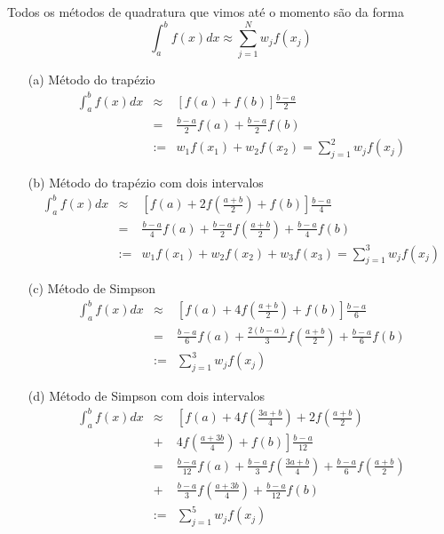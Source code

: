 Todos os métodos de quadratura que vimos até o momento são da forma
$$\int_a^b f(x)dx \approx \sum_{j=1}^N w_j f(x_j)$$
\begin{ex}
\begin{itemize}
\item[(a)] Método do trapézio
\begin{eqnarray*}
\int_a^b f(x)dx &\approx& \left[f(a)+f(b)\right]\frac{b-a}{2}\\
&=&\frac{b-a}{2}f(a)+\frac{b-a}{2}f(b)\\
&:=&w_1f(x_1)+w_2f(x_2)= \sum_{j=1}^2 w_j f(x_j)
\end{eqnarray*}

\item[(b)] Método do trapézio com dois intervalos
\begin{eqnarray*}
\int_a^b f(x)dx &\approx& \left[f(a)+2f\left(\frac{a+b}{2}\right)+f(b)\right]\frac{b-a}{4}\\
&=&\frac{b-a}{4}f(a)+\frac{b-a}{2}f\left(\frac{a+b}{2}\right)+\frac{b-a}{4}f(b)\\
&:=&w_1f(x_1)+w_2f(x_2)+w_3f(x_3)= \sum_{j=1}^3 w_j f(x_j)
\end{eqnarray*}

\item[(c)] Método de Simpson
\begin{eqnarray*}
\int_a^b f(x)dx &\approx& \left[f(a)+4f\left(\frac{a+b}{2}\right)+f(b)\right]\frac{b-a}{6}\\
&=&\frac{b-a}{6}f(a)+\frac{2(b-a)}{3}f\left(\frac{a+b}{2}\right)+\frac{b-a}{6}f(b)\\
&:=&\sum_{j=1}^3 w_j f(x_j)
\end{eqnarray*}

\item[(d)] Método de Simpson com dois intervalos
\begin{eqnarray*}
\int_a^b f(x)dx &\approx& \left[f(a)+4f\left(\frac{3a+b}{4}\right)+2f\left(\frac{a+b}{2}\right)\right.\\
&+& \left. 4f\left(\frac{a+3b}{4}\right)+f(b)\right]\frac{b-a}{12}\\
&=&\frac{b-a}{12}f(a)+\frac{b-a}{3}f\left(\frac{3a+b}{4}\right)+\frac{b-a}{6}f\left(\frac{a+b}{2}\right)\\
&+&\frac{b-a}{3}f\left(\frac{a+3b}{4}\right)+\frac{b-a}{12}f(b)\\
&:=&\sum_{j=1}^5 w_j f(x_j)
\end{eqnarray*}

\end{itemize}
\end{ex}

